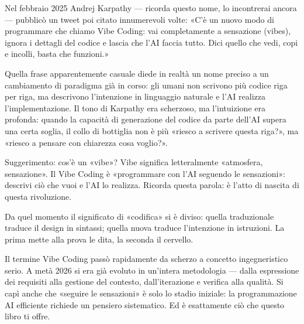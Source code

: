 


Nel febbraio 2025 Andrej Karpathy — ricorda questo nome, lo incontrerai ancora — pubblicò un tweet poi citato innumerevoli volte: «C'è un nuovo modo di programmare che chiamo Vibe Coding: vai completamente a sensazione (vibes), ignora i dettagli del codice e lascia che l'AI faccia tutto. Dici quello che vedi, copi e incolli, basta che funzioni.»

Quella frase apparentemente casuale diede in realtà un nome preciso a un cambiamento di paradigma già in corso: gli umani non scrivono più codice riga per riga, ma descrivono l'intenzione in linguaggio naturale e l'AI realizza l'implementazione. Il tono di Karpathy era scherzoso, ma l'intuizione era profonda: quando la capacità di generazione del codice da parte dell'AI supera una certa soglia, il collo di bottiglia non è più «riesco a scrivere questa riga?», ma «riesco a pensare con chiarezza cosa voglio?».

\begin{tcbinfo}{Suggerimento: cos'è un «vibe»?}
Vibe significa letteralmente «atmosfera, sensazione». Il Vibe Coding è «programmare con l'AI seguendo le sensazioni»: descrivi ciò che vuoi e l'AI lo realizza. Ricorda questa parola: è l'atto di nascita di questa rivoluzione.

\end{tcbinfo}

Da quel momento il significato di «codifica» si è diviso: quella traduzionale traduce il design in sintassi; quella nuova traduce l'intenzione in istruzioni. La prima mette alla prova le dita, la seconda il cervello.

Il termine Vibe Coding passò rapidamente da scherzo a concetto ingegneristico serio. A metà 2026 si era già evoluto in un'intera metodologia — dalla espressione dei requisiti alla gestione del contesto, dall'iterazione e verifica alla qualità. Si capì anche che «seguire le sensazioni» è solo lo stadio iniziale: la programmazione AI efficiente richiede un pensiero sistematico. Ed è esattamente ciò che questo libro ti offre.

